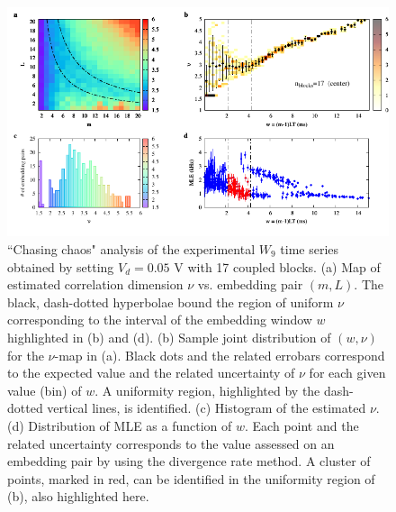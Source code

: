 \begin{figure}[H]
    \centering
    \includegraphics[width=\linewidth]{../blocks/17_blocks/middle/2e5_points/plots/chaos_low.pdf}
    \caption{``Chasing chaos" analysis of the experimental $W_9$ time series obtained by setting $V_d=0.05$ V with 17 coupled blocks.
    (a) Map of estimated correlation dimension $\nu$ vs. embedding pair $(m, L)$.
    The black, dash-dotted hyperbolae bound the region of uniform $\nu$ corresponding to the interval of the
    embedding window $w$ highlighted in (b) and (d).
    (b) Sample joint distribution of $(w,\nu)$ for the $\nu$-map in (a).
    Black dots and the related errobars correspond to the expected value and the related uncertainty of $\nu$
    for each given value (bin) of $w$. A uniformity region, highlighted by the dash-dotted vertical lines,
    is identified. (c) Histogram of the estimated $\nu$. (d) Distribution of MLE as a function of $w$. Each point and the related
    uncertainty corresponds to the value assessed on an embedding pair by using the divergence rate method.
    A cluster of points, marked in red, can be identified in the uniformity region of (b), also highlighted here.}
    \label{fig:17 blocks chaos middle}
\end{figure}


